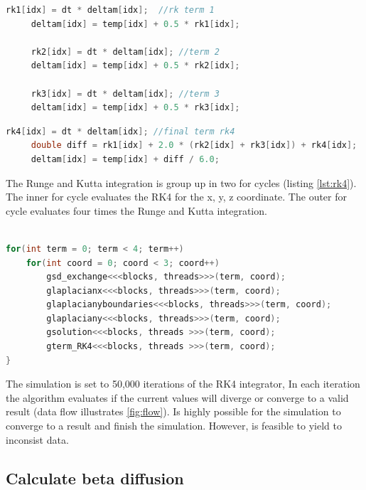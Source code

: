 \begin{lstlisting}[language=C++, label={lst:rkcuda}, caption={Runge and Kutta 1st, 2nd and 3rd terms}]
     rk1[idx] = dt * deltam[idx];  //rk term 1
     deltam[idx] = temp[idx] + 0.5 * rk1[idx];
     
     rk2[idx] = dt * deltam[idx]; //term 2
     deltam[idx] = temp[idx] + 0.5 * rk2[idx];
     
     rk3[idx] = dt * deltam[idx]; //term 3
     deltam[idx] = temp[idx] + 0.5 * rk3[idx];
\end{lstlisting}
    
\begin{lstlisting}[language=C++, label={lst:rk4cuda}, caption={4th term of the Runge and Kutta integration}] 
     rk4[idx] = dt * deltam[idx]; //final term rk4
     double diff = rk1[idx] + 2.0 * (rk2[idx] + rk3[idx]) + rk4[idx];
     deltam[idx] = temp[idx] + diff / 6.0;	
\end{lstlisting}


The Runge and Kutta integration is group up in two {\listf for} cycles (listing \ref{lst:rk4}). The inner {\listf for} cycle evaluates the RK4 for the x, y, z coordinate. The outer {\listf for} cycle evaluates four times the Runge and Kutta integration.

\begin{lstlisting}[language=C++, label={lst:rk4}, caption={Summarize of Runge and Kutta 4th Integration}]	

for(int term = 0; term < 4; term++)
	for(int coord = 0; coord < 3; coord++)
    	gsd_exchange<<<blocks, threads>>>(term, coord);
    	glaplacianx<<<blocks, threads>>>(term, coord);
    	glaplacianyboundaries<<<blocks, threads>>>(term, coord);
    	glaplaciany<<<blocks, threads>>>(term, coord);
    	gsolution<<<blocks, threads >>>(term, coord);
    	gterm_RK4<<<blocks, threads >>>(term, coord);
}
\end{lstlisting}

 The simulation is set to 50,000 iterations of the RK4 integrator, In each iteration the algorithm evaluates if the current values will diverge or converge to a valid result (data flow illustrates \ref{fig:flow}). Is highly possible for the simulation to converge to a result and finish the simulation. However, is feasible to yield to inconsist data.
 
\subsection{Calculate beta diffusion}

